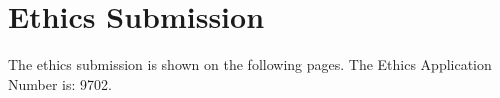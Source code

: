 \chapter{Ethics Submission}

The ethics submission is shown on the following pages. The Ethics Application Number is: 9702.


